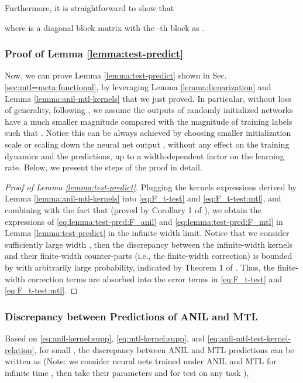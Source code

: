 \documentclass{article}
\begin{document}
    Furthermore, it is straightforward to show that
    
    where  is a diagonal block matrix with the -th block as .
\subsubsection{Proof of Lemma \ref{lemma:test-predict}} \label{supp:proof:proof-of-lemma-test-predict}
Now, we can prove Lemma \ref{lemma:test-predict} shown in Sec. \ref{sec:mtl=meta:functional}, by leveraging Lemma \ref{lemma:lienarization} and Lemma \ref{lemma:anil-mtl-kernels} that we just proved. In particular, without loss of generality, following \citet{CNTK}, we assume the outputs of randomly initialized networks have a much smaller magnitude compared with the magnitude of training labels such that . Notice this can be always achieved by choosing smaller initialization scale or scaling down the neural net output \cite{CNTK}, without any effect on the training dynamics and the predictions, up to a width-dependent factor on the learning rate. Below, we present the steps of the proof in detail.


\begin{proof}[Proof of Lemma \ref{lemma:test-predict}]
Plugging the kernels expressions derived by Lemma \ref{lemma:anil-mtl-kernels} into \eqref{eq:F_t-test} and \eqref{eq:F_t-test:mtl}, and combining with the fact that  (proved by Corollary 1 of \citet{lee2019wide}), we obtain the expressions of \eqref{eq:lemma:test-pred:F_anil} and \eqref{eq:lemma:test-pred:F_mtl} in Lemma \ref{lemma:test-predict} in the infinite width limit. Notice that we consider sufficiently large width , then the discrepancy between the infinite-width kernels and their finite-width counter-parts (i.e., the finite-width correction) is bounded by  with arbitrarily large probability, indicated by Theorem 1 of \citet{Hanin2020Finite}. Thus, the finite-width correction terms are absorbed into the  error terms in \eqref{eq:F_t-test} and \eqref{eq:F_t-test:mtl}.

\end{proof}
\subsubsection{Discrepancy between Predictions of ANIL and MTL}\label{supp:proof:pred-diff}
Based on \eqref{eq:anil-kernel:supp}, \eqref{eq:mtl-kernel:supp}, and \eqref{eq:anil-mtl-test-kernel-relation}, for small , the discrepancy between ANIL and MTL predictions can be written as (Note: we consider neural nets trained under ANIL and MTL for infinite time , then take their parameters  and  for test on any task ),
\end{document}
